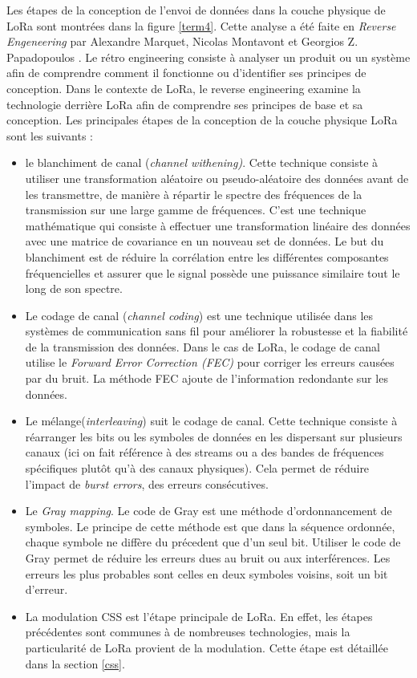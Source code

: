 Les étapes de la conception de l'envoi de données dans la couche physique de LoRa sont montrées dans la figure \ref{term4}. Cette analyse a été faite en \textit{Reverse Engeneering} par Alexandre Marquet, Nicolas Montavont et Georgios Z. Papadopoulos \cite{lorareverse}. Le rétro engineering consiste à analyser un produit ou un système afin de comprendre comment il fonctionne ou d'identifier ses principes de conception. Dans le contexte de LoRa, le reverse engineering examine la technologie derrière LoRa afin de comprendre ses principes de base et sa conception. Les principales étapes de la conception de la couche physique LoRa sont les suivants :

\vspace{0.1cm}

\begin{itemize}
\item le blanchiment de canal (\textit{channel withening)}.
Cette technique consiste à utiliser une transformation aléatoire ou pseudo-aléatoire des données avant de les transmettre, de manière à répartir le spectre des fréquences de la transmission sur une large gamme de fréquences. C'est une technique mathématique qui consiste à effectuer une transformation linéaire des données avec une matrice de covariance en un nouveau set de données. Le but du blanchiment est de réduire la corrélation entre les différentes composantes fréquencielles et assurer que le signal possède une puissance similaire tout le long de son spectre.
\item Le codage de canal (\textit{channel coding}) est une technique utilisée dans les systèmes de communication sans fil pour améliorer la robustesse et la fiabilité de la transmission des données. Dans le cas de LoRa, le codage de canal utilise le \textit{Forward Error Correction (FEC)} pour corriger les erreurs causées par du bruit. La méthode FEC ajoute de l'information redondante sur les données.
\item Le mélange(\textit{interleaving}) suit le codage de canal.  
Cette technique consiste à réarranger les bits ou les symboles de données en les dispersant sur plusieurs canaux (ici on fait référence à des streams ou a des bandes de fréquences spécifiques plutôt qu'à des canaux physiques). Cela permet de réduire l'impact de \textit{burst errors}, des erreurs consécutives.
\item Le \textit{Gray mapping}. Le code de Gray est une méthode d'ordonnancement de symboles. Le principe de cette méthode est que dans la séquence ordonnée, chaque symbole ne diffère du précedent que d'un seul bit. Utiliser le code de Gray permet de réduire les erreurs dues au bruit ou aux interférences. Les erreurs les plus probables sont celles en deux symboles voisins, soit un bit d'erreur.
\item La modulation CSS est l'étape principale de LoRa. En effet, les étapes précédentes sont communes à de nombreuses technologies, mais la particularité de LoRa provient de la modulation. Cette étape est détaillée dans la section \ref{css}.
\end{itemize}


